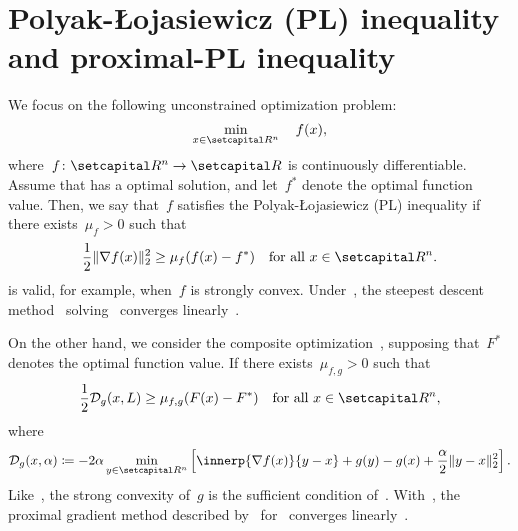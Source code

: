\documentclass[../main]{subfiles}
\begin{document}
\section{Polyak-{\L}ojasiewicz (PL) inequality and proximal-PL inequality} 
We focus on the following unconstrained optimization problem:
\begin{equation} \label{eq:differentiable_OP}
    \min_{x \in \setR^n} \quad f(x)
,\end{equation}
where~$f \colon \setR^n \to \setR$ is continuously differentiable.
Assume that  has a optimal solution, and let~$f^*$ denote the optimal function value.
Then, we say that~$f$ satisfies the Polyak-{\L}ojasiewicz (PL) inequality if there exists~$\mu_f > 0$ such that
\begin{equation} \label{eq:PL}
    \frac{1}{2} \norm{\nabla f(x)}_2^2 \ge \mu_f (f(x) - f^*) \forallcondition{x \in \setR^n}
.\end{equation}
 is valid, for example, when~$f$ is strongly convex.
Under~, the steepest descent method~\cite{Cauchy1847} solving~ converges linearly~\cite{Polyak1963}.

On the other hand, we consider the composite optimization~, supposing that~$F^*$ denotes the optimal function value.
If there exists~$\mu_{f, g} > 0$ such that
\begin{equation} \label{eq:proximal_PL}
    \frac{1}{2} \mathcal{D}_g(x, L) \ge \mu_{f, g} (F(x) - F^*) \forallcondition{x \in \setR^n}
,\end{equation}
where
\begin{equation}
    \mathcal{D}_g(x, \alpha) \coloneqq - 2 \alpha \min_{y \in \setR^n} \left[ \innerp{\nabla f(x)}{y - x} + g(y) - g(x) + \frac{\alpha}{2} \norm{y - x}_2^2 \right] 
.\end{equation}
Like~, the strong convexity of~$g$ is the sufficient condition of~.
With~, the proximal gradient method described by~ for~ converges linearly~\cite{Karimi2016}.
\end{document}

